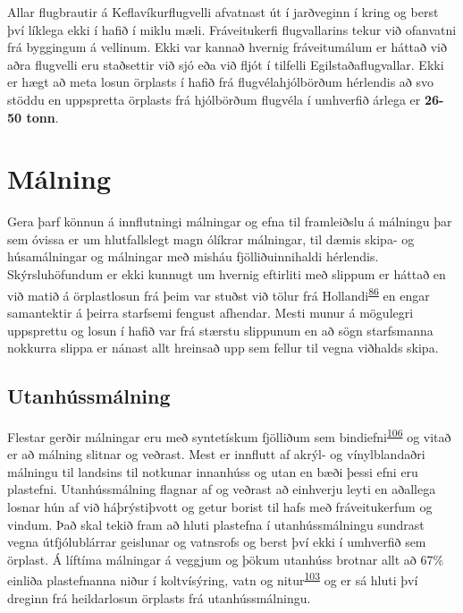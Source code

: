 \documentclass[icelandic,]{book}
\begin{document}
Allar flugbrautir á Keflavíkurflugvelli afvatnast út í jarðveginn í kring og berst því líklega ekki í hafið í miklu mæli. Fráveitukerfi flugvallarins tekur við ofanvatni frá byggingum á vellinum. Ekki var kannað hvernig fráveitumálum er háttað við aðra flugvelli eru staðsettir við sjó eða við fljót í tilfelli Egilstaðaflugvallar. Ekki er hægt að meta losun örplasts í hafið frá flugvélahjólbörðum hérlendis að svo stöddu en uppspretta örplasts frá hjólbörðum flugvéla í umhverfið árlega er \textbf{26-50 tonn}.

\hypertarget{malning}{%
\section*{Málning}\label{malning}}

Gera þarf könnun á innflutningi málningar og efna til framleiðslu á málningu þar sem óvissa er um hlutfallslegt magn ólíkrar málningar, til dæmis skipa- og húsamálningar og málningar með misháu fjölliðuinnihaldi hérlendis. Skýrsluhöfundum er ekki kunnugt um hvernig eftirliti með slippum er háttað en við matið á örplastlosun frá þeim var stuðst við tölur frá Hollandi\textsuperscript{\protect\hyperlink{ref-Verschoor2016}{86}} en engar samantektir á þeirra starfsemi fengust afhendar. Mesti munur á mögulegri uppsprettu og losun í hafið var frá stærstu slippunum en að sögn starfsmanna nokkurra slippa er nánast allt hreinsað upp sem fellur til vegna viðhalds skipa.

\hypertarget{utanhussmalning}{%
\subsection*{Utanhússmálning}\label{utanhussmalning}}

Flestar gerðir málningar eru með syntetískum fjölliðum sem bindiefni\textsuperscript{\protect\hyperlink{ref-Durkin2018}{106}} og vitað er að málning slitnar og veðrast. Mest er innflutt af akrýl- og vínylblandaðri málningu til landsins til notkunar innanhúss og utan en bæði þessi efni eru plastefni. Utanhússmálning flagnar af og veðrast að einhverju leyti en aðallega losnar hún af við háþrýstiþvott og getur borist til hafs með fráveitukerfum og vindum. Það skal tekið fram að hluti plastefna í utanhússmálningu sundrast vegna útfjólublárrar geislunar og vatnsrofs og berst því ekki í umhverfið sem örplast. Á líftíma málningar á veggjum og þökum utanhúss brotnar allt að 67\% einliða plastefnanna niður í koltvísýring, vatn og nitur\textsuperscript{\protect\hyperlink{ref-Hann2018}{103}} og er sá hluti því dreginn frá heildarlosun örplasts frá utanhússmálningu.
\end{document}
